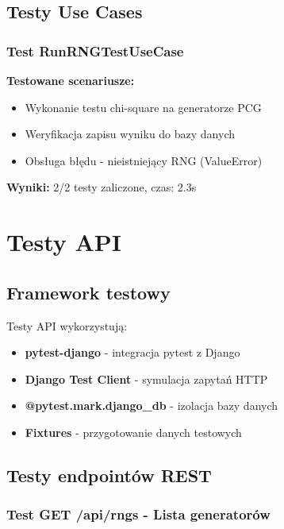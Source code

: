 \documentclass[12pt,a4paper]{article}
\begin{document}
\subsection{Testy Use Cases}

\subsubsection{Test RunRNGTestUseCase}

\textbf{Testowane scenariusze:}
\begin{itemize}
    \item Wykonanie testu chi-square na generatorze PCG
    \item Weryfikacja zapisu wyniku do bazy danych
    \item Obsługa błędu - nieistniejący RNG (ValueError)
\end{itemize}

\textbf{Wyniki:} 2/2 testy zaliczone, czas: 2.3s

\newpage

\section{Testy API}

\subsection{Framework testowy}

Testy API wykorzystują:
\begin{itemize}
    \item \textbf{pytest-django} - integracja pytest z Django
    \item \textbf{Django Test Client} - symulacja zapytań HTTP
    \item \textbf{@pytest.mark.django\_db} - izolacja bazy danych
    \item \textbf{Fixtures} - przygotowanie danych testowych
\end{itemize}

\subsection{Testy endpointów REST}

\subsubsection{Test GET /api/rngs - Lista generatorów}
\end{document}
